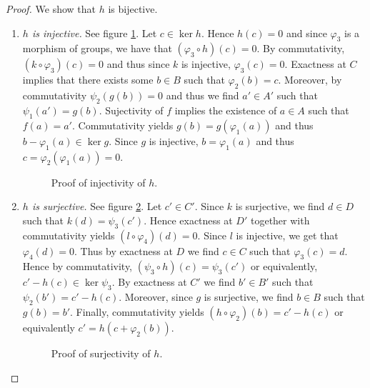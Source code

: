 \begin{proof} 
	We show that $h$ is bijective.
	\begin{enumerate}[label = \textit{Step \arabic*:}, wide = 0pt]
		\item \textit{$h$ is injective.} See figure \ref{fig:h_injective}. Let $c \in \ker h$. Hence $h(c) = 0$ and since $\varphi_3$ is a morphism of groups, we have that $(\varphi_3 \circ h)(c) = 0$. By commutativity, $(k \circ \varphi_3)(c) = 0$ and thus since $k$ is injective, $\varphi_3(c) = 0$. Exactness at $C$ implies that there exists some $b \in B$ such that $\varphi_2(b) = c$. Moreover, by commutativity $\psi_2(g(b)) = 0$ and thus we find $a' \in A'$ such that $\psi_1(a') = g(b)$. Sujectivity of $f$ implies the existence of $a \in A$ such that $f(a) = a'$. Commutativity yields $g(b) = g(\varphi_1(a))$ and thus $b - \varphi_1(a) \in \ker g$. Since $g$ is injective, $b = \varphi_1(a)$ and thus $c = \varphi_2(\varphi_1(a)) = 0$.  
			\begin{figure}[h!tb]
				\centering
				\caption{Proof of injectivity of $h$.}
				\label{fig:h_injective}
			\end{figure}

		\item \textit{$h$ is surjective.} See figure \ref{fig:h_surjective}. Let $c' \in C'$. Since $k$ is surjective, we find $d \in D$ such that $k(d) = \psi_3(c')$. Hence exactness at $D'$ together with commutativity yields $(l \circ \varphi_4)(d) = 0$. Since $l$ is injective, we get that $\varphi_4(d) = 0$. Thus by exactness at $D$ we find $c \in C$ such that $\varphi_3(c) = d$. Hence by commutativity, $(\psi_3 \circ h)(c) = \psi_3(c')$ or equivalently, $c' - h(c) \in \ker \psi_3$. By exactness at $C'$ we find $b' \in B'$ such that $\psi_2(b') = c' - h(c)$. Moreover, since $g$ is surjective, we find $b \in B$ such that $g(b) = b'$. Finally, commutativity yields $(h \circ \varphi_2)(b) = c' - h(c)$ or equivalently $c' = h(c + \varphi_2(b))$.
			\begin{figure}[h!tb]
				\centering
				\caption{Proof of surjectivity of $h$.}
				\label{fig:h_surjective}
			\end{figure}
	\end{enumerate}
\end{proof}
